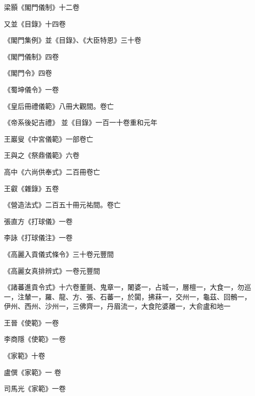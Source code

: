 \begin{pinyinscope}
 梁顥《閣門儀制》十二卷



 又並《目錄》十四卷



 《閣門集例》並《目錄》、《大臣特恩》三十卷



 《閣門儀制》四卷



 《閣門令》四卷



 《蜀坤儀令》一卷



 《皇后冊禮儀範》八冊大觀間。卷亡



 《帝系後妃吉禮》
 並《目錄》一百一十卷重和元年



 王巖叟《中宮儀範》一部卷亡



 王與之《祭鼎儀範》六卷



 高中《六尚供奉式》二百冊卷亡



 王叡《雜錄》五卷



 《營造法式》二百五十冊元祐間。卷亡



 張直方《打球儀》一卷



 李詠《打球儀注》一卷



 《高麗入貢儀式條令》三十卷元豐間



 《高麗女真排辨式》一卷元豐間



 《諸蕃進貢令式》十六卷董氈、鬼章一，闍婆一，占城一，層檀一，大食一，勿巡一，注輦一，羅、龍、方、張、石蕃一，於闐，拂菻一，交州一，龜茲、回鶻一，伊州、西州、沙州一，三佛齊一，丹眉流一，大食陀婆離一，大俞盧和地一



 王晉《使範》一卷



 李商隱《使範》一卷



 《家範》十卷



 盧僎《家範》一
 卷



 司馬光《家範》一卷




\end{pinyinscope}
